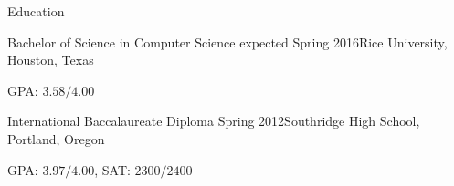 \documentclass{resume}
\begin{document}
\begin{rSection}{Education}

\begin{rSubSection}{Bachelor of Science in Computer Science}
{expected Spring 2016}{Rice University, Houston, Texas}{}
    \item GPA: $3.58/4.00$
\end{rSubSection}

\begin{rSubSection}{International Baccalaureate Diploma}
{Spring 2012}{Southridge High School, Portland, Oregon}{}
    \item GPA: $3.97/4.00$, SAT: $2300/2400$
\end{rSubSection}

\end{rSection}





\iftoggle{cv}{\begin{rSection}{Pertinent Coursework}

    \Event{class 1}{Fall 2015} \\
    \Event{class 2}{Fall 2015} \\
    \Event{class 3}{Fall 2015} \\
    \Event{Operating Systems and Concurrent Programing (B)}{Spring 2015} \\
    \Event{Introduction to Computer Security (A+)}{Spring 2015} \\
    \Event{Reasoning about Algorithms (A)}{Fall 2014} \\
    \Event{Compiler Construction (A-)}{Fall 2014} \\
    \Event{Object-Oriented Design (A)}{Fall 2014} \\
    \Event{Principles of Parallel Programming (B)}{Spring 2014} \\
    \Event{Introduction to Computer Systems (A-)}{Spring 2014} \\
    \Event{Introduction to Program Design (A)}{Fall 2013} \\
    \Event{Algorithmic Thinking (A-)}{Spring 2013} \\
    \Event{Fundamentals of Computer Engineering (B-)}{Spring 2013} \\
    \Event{Computational Thinking (A)}{Fall 2012} \\
    \Event{Introduction to Computational Engineering (A+)}{Fall 2012}

\end{rSection}}{}
\end{document}
